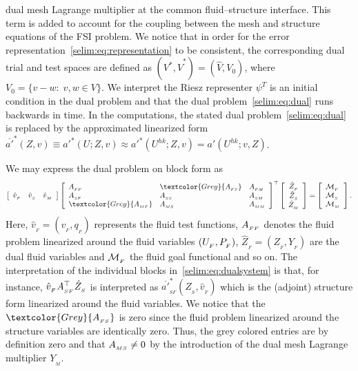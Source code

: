 dual mesh Lagrange multiplier at the common fluid--structure
interface.  This term is added to account for the coupling between the
mesh and structure equations of the FSI problem.  We notice that in
order for the error representation~\eqref{selim:eq:representation} to
be consistent, the corresponding dual trial and test spaces are
defined as $(V^*,
\hat{V}^*)=(\hat{V}, V_0)$, where  $V_0 = \{v-w:\;v,w\in V
\}$. We interpret the Riesz representer $\psi^T$ is an initial condition in
the dual problem and that the dual problem~\eqref{selim:eq:dual} runs
backwards in time. In the computations, the stated dual
problem~\eqref{selim:eq:dual} is replaced by the approximated
linearized form $\overline{a'}^{*}(Z, v) \equiv a'^{*}(U; Z, v)
\approx a'^{*}(U^{hk}; Z, v)  = a'(U^{hk}; v, Z)$.

We may express the dual problem on block form as
\begin{equation}
\label{selim:eq:dualsystem}
\left[\begin{array}{ccc} \hat{v}_{_{F}} & \hat{v}_{_{S}} & \hat{v}_{_{M}}
  \end{array} \right]
\left[\begin{array}{lll} \AFF & \textcolor{Grey}{\AFS} & \AFM
    \\ \ASF & \ASS & \ASM \\ \textcolor{Grey}{\AMF} & \AMS &
    \AMM
\end{array} \right]^{\top}
\left[ \begin{array}{c} \hat{Z}_{_{F}} \\ \hat{Z}_{_{S}}
    \\ \hat{Z}_{_{M}} \end{array} \right] =\left[ \begin{array}{l}
    \M_{_{F}}\\ \M_{{_S}}\\ \M_{_{M}} \end{array} \right].
\end{equation}
Here, $\hat{v}_{_{F}} = (v_{_{F}}, q_{_{F}})$ represents the fluid
test functions, $A_{_{FF}}$ denotes the fluid problem linearized around the
fluid variables $(U_{_{F}},P_{_{F}})$, $\hat{Z}_{_{F}} = (Z_{_{F}}, Y_{_{F}})$
are the dual fluid variables and $\mathcal{M}_{_{F}}$ the fluid goal functional
and so on. The interpretation of the individual blocks
in~\eqref{selim:eq:dualsystem} is that, for instance,
$\hat{v}_{_{F}}A_{_{SF}}^{\top}\hat{Z}_{_{S}} $ is interpreted as
$\overline{a'}^*_{_{SF}}(\hat{Z}_{_{S}}, \hat{v}_{_{F}})$ which is the
(adjoint) structure form linearized around the fluid variables.  We
notice that the $\textcolor{Grey}{\AFS}$ is zero since the fluid
problem linearized around the structure variables are identically
zero. Thus, the grey colored entries are by definition zero and that
$A_{_{MS}} \neq 0$ by the introduction of the dual mesh Lagrange multiplier
$Y_{_{M}}$.

